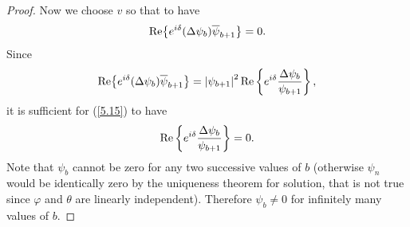 \documentclass[pdftex]{sigma}
\numberwithin{equation}{section}
\begin{document}
\begin{proof}
Now we choose $v$ so that to have%
\begin{equation}
{\rm Re}\big\{e^{i\delta }(\Delta \psi _{b})\overline{\psi }_{b+1}\big\}=0.
\label{5.15}
\end{equation}%
Since%
\[
{\rm Re}\big\{e^{i\delta }(\Delta \psi _{b})\overline{\psi }_{b+1}\big\}=\left\vert
\psi _{b+1}\right\vert ^{2}{\rm Re}\left\{ e^{i\delta }\frac{\Delta \psi
_{b}}{\psi _{b+1}}\right\} ,
\]%
it is suf\/f\/icient for (\ref{5.15}) to have%
\begin{equation}
{\rm Re}\left\{ e^{i\delta }\frac{\Delta \psi _{b}}{\psi _{b+1}}\right\} =0.
\label{5.16}
\end{equation}%
Note that $\psi _{b}$ cannot be zero for any two successive values of $b$
(otherwise $\psi _{n}$ would be identically zero by the uniqueness theorem
for solution, that is not true since $\varphi $ and $\theta $ are linearly
independent). Therefore $\psi _{b}\neq 0$ for inf\/initely many values of $b.$


\end{proof}
\end{document}
